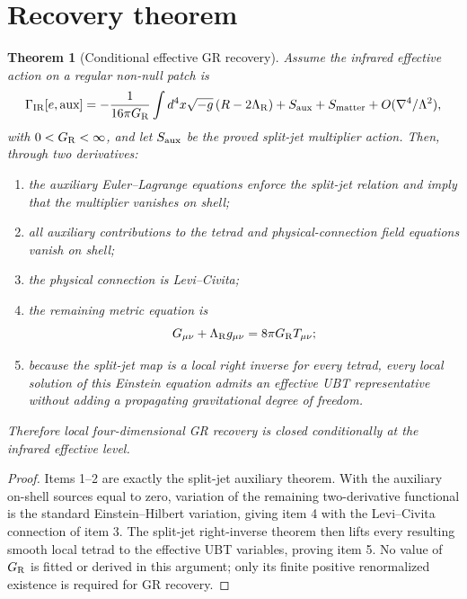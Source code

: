 \documentclass[11pt,a4paper]{article}
\newtheorem{theorem}{Theorem}
\begin{document}
\section{Recovery theorem}
\begin{theorem}[Conditional effective GR recovery]
Assume the infrared effective action on a regular non-null patch is
\begin{equation}
\Gamma_{\rm IR}[e,\text{aux}]
=-\frac{1}{16\pi G_{\rm R}}\int d^4x\sqrt{-g}\,(R-2\Lambda_{\rm R})
+S_{\rm aux}+S_{\rm matter}+O(\nabla^4/\Lambda^2),
\end{equation}
with $0<G_{\rm R}<\infty$, and let $S_{\rm aux}$ be the proved split-jet
multiplier action.  Then, through two derivatives:
\begin{enumerate}
\item the auxiliary Euler--Lagrange equations enforce the split-jet relation
and imply that the multiplier vanishes on shell;
\item all auxiliary contributions to the tetrad and physical-connection field
equations vanish on shell;
\item the physical connection is Levi--Civita;
\item the remaining metric equation is
\begin{equation}
G_{\mu\nu}+\Lambda_{\rm R}g_{\mu\nu}
=8\pi G_{\rm R}T_{\mu\nu};
\end{equation}
\item because the split-jet map is a local right inverse for every tetrad,
every local solution of this Einstein equation admits an effective UBT
representative without adding a propagating gravitational degree of freedom.
\end{enumerate}
Therefore local four-dimensional GR recovery is closed conditionally at the
infrared effective level.
\end{theorem}

\begin{proof}
Items 1--2 are exactly the split-jet auxiliary theorem.  With the auxiliary
on-shell sources equal to zero, variation of the remaining two-derivative
functional is the standard Einstein--Hilbert variation, giving item 4 with the
Levi--Civita connection of item 3.  The split-jet right-inverse theorem then
lifts every resulting smooth local tetrad to the effective UBT variables,
proving item 5.  No value of $G_{\rm R}$ is fitted or derived in this argument;
only its finite positive renormalized existence is required for GR recovery.
\end{proof}
\end{document}
